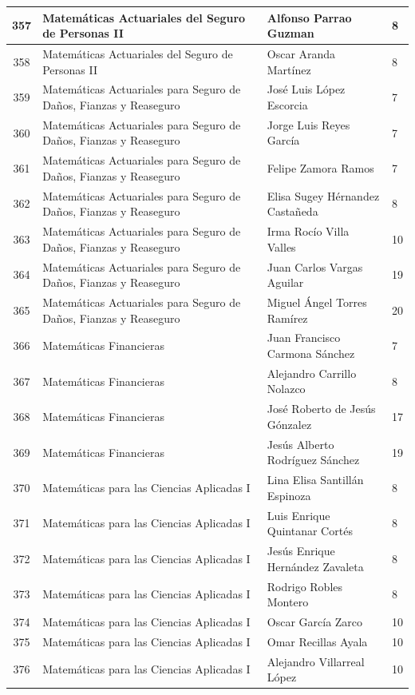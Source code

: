 {\begin{longtable}{|c|p{6.5cm}|p{5cm}|p{1.5cm}|}
357 & Matemáticas Actuariales del Seguro de Personas II & Alfonso Parrao Guzman & 8 \\ \hline
358 & Matemáticas Actuariales del Seguro de Personas II & Oscar Aranda Martínez & 8 \\ \hline
359 & Matemáticas Actuariales para Seguro de Daños, Fianzas y Reaseguro & José Luis López Escorcia & 7 \\ \hline
360 & Matemáticas Actuariales para Seguro de Daños, Fianzas y Reaseguro & Jorge Luis Reyes García & 7 \\ \hline
361 & Matemáticas Actuariales para Seguro de Daños, Fianzas y Reaseguro & Felipe Zamora Ramos & 7 \\ \hline
362 & Matemáticas Actuariales para Seguro de Daños, Fianzas y Reaseguro & Elisa Sugey Hérnandez Castañeda & 8 \\ \hline
363 & Matemáticas Actuariales para Seguro de Daños, Fianzas y Reaseguro & Irma Rocío Villa Valles & 10 \\ \hline
364 & Matemáticas Actuariales para Seguro de Daños, Fianzas y Reaseguro & Juan Carlos Vargas Aguilar & 19 \\ \hline
365 & Matemáticas Actuariales para Seguro de Daños, Fianzas y Reaseguro & Miguel Ángel Torres Ramírez & 20 \\ \hline
366 & Matemáticas Financieras & Juan Francisco Carmona Sánchez & 7 \\ \hline
367 & Matemáticas Financieras & Alejandro Carrillo Nolazco & 8 \\ \hline
368 & Matemáticas Financieras & José Roberto de Jesús Gónzalez & 17 \\ \hline
369 & Matemáticas Financieras & Jesús Alberto Rodríguez Sánchez & 19 \\ \hline
370 & Matemáticas para las Ciencias Aplicadas I & Lina Elisa Santillán Espinoza & 8 \\ \hline
371 & Matemáticas para las Ciencias Aplicadas I & Luis Enrique Quintanar Cortés & 8 \\ \hline
372 & Matemáticas para las Ciencias Aplicadas I & Jesús Enrique Hernández Zavaleta & 8 \\ \hline
373 & Matemáticas para las Ciencias Aplicadas I & Rodrigo Robles Montero & 8 \\ \hline
374 & Matemáticas para las Ciencias Aplicadas I & Oscar García Zarco & 10 \\ \hline
375 & Matemáticas para las Ciencias Aplicadas I & Omar Recillas Ayala & 10 \\ \hline
376 & Matemáticas para las Ciencias Aplicadas I & Alejandro Villarreal López & 10 \\ \hline

\end{longtable}}
